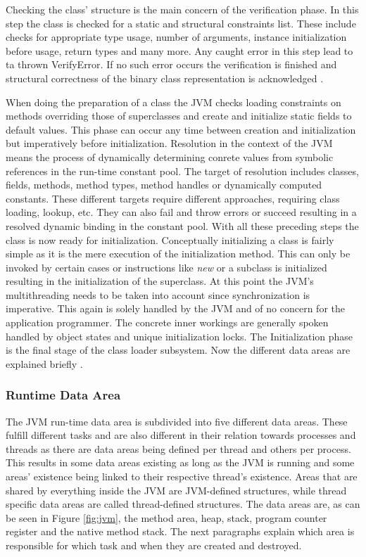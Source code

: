 Checking the class' structure is the main concern of the verification phase. In this step the class is checked for a static and structural constraints list. These include checks for appropriate type usage, number of arguments, instance initialization before usage, return types and many more. Any caught error in this step lead to ta thrown VerifyError. If no such error occurs the verification is finished and structural correctness of the binary class representation is acknowledged \cite{Lindholm}.

When doing the preparation of a class the JVM checks loading constraints on methods overriding those of superclasses and create and initialize static fields to default values. This phase can occur any time between creation and initialization but imperatively before initialization. Resolution in the context of the JVM means the process of dynamically determining conrete values from symbolic references in the run-time constant pool. The target of resolution includes classes, fields, methods, method types, method handles or dynamically computed constants. These different targets require different approaches, requiring class loading, lookup, etc. They can also fail and throw errors or succeed resulting in a resolved dynamic binding in the constant pool. With all these preceding steps the class is now ready for initialization.
Conceptually initializing a class is fairly simple as it is the mere execution of the initialization method. This can only be invoked by certain cases or instructions like \emph{new} or a subclass is initialized resulting in the initialization of the superclass. At this point the JVM's multithreading needs to be taken into account since synchronization is imperative. This again is solely handled by the JVM and of no concern for the application programmer. The concrete inner workings are generally spoken handled by object states and unique initialization locks. The Initialization phase is the final stage of the class loader subsystem. Now the different data areas are explained briefly \cite{Lindholm}.

\subsubsection{Runtime Data Area}

The JVM run-time data area is subdivided into five different data areas. These fulfill different tasks and are also different in their relation towards processes and threads as there are data areas being defined per thread and others per process. This results in some data areas existing as long as the JVM is running and some areas' existence being linked to their respective thread's existence. Areas that are shared by everything inside the JVM are JVM-defined structures, while thread specific data areas are called thread-defined structures. The data areas are, as can be seen in Figure \ref{fig:jvm}, the method area, heap, stack, program counter register and the native method stack. The next paragraphs explain which area is responsible for which task and when they are created and destroyed.

